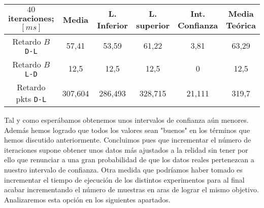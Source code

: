 \documentclass{article}[10pt]
\begin{document}
		\vskip 3mm

		\begin{tabular}{| c | c | c | c | c | c |}
			\hline
			$40$ iteraciones; $[ms]$ & Media & L. Inferior & L. superior & Int. Confianza & Media Teórica\\
			\hline
			Retardo $B$ \texttt{D-L} & 57,41 & 53,59 & 61,22 & 3,81 & 63,29\\
			\hline
			Retardo $B$ \texttt{L-D} & 12,5 & 12,5 & 12,5 & 0 & 12,5\\
			\hline
			Retardo pkts \texttt{D-L} & 307,604 & 286,493 & 328,715 & 21,111 & 319,7\\
			\hline
		\end{tabular}

		\vskip 3mm

		Tal y como esperábamos obtenemos unos intervalos de confianza aún menores. Además hemos logrado que todos los valores sean "buenos" en los términos que hemos discutido anteriormente. Concluimos pues que incrementar el número de iteraciones supone obtener unos datos más ajustados a la relidad sin tener por ello que renunciar a una gran probabilidad de que los datos reales pertenezcan a nuestro intervalo de confianza. Otra medida que podríamos haber tomado es incrementar el tiempo de ejecución de los distintos experimentos para al final acabar incrementando el número de muestras en aras de lograr el mismo objetivo. Analizaremos esta opción en los siguientes apartados.
\end{document}
